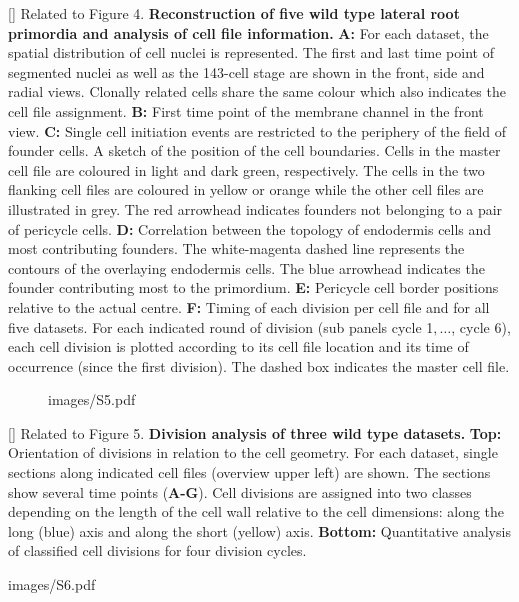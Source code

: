 []{
Related to Figure 4.
{\bf Reconstruction of five wild type lateral root primordia and analysis of cell file information.} {\bf A:} For each dataset, the spatial distribution of cell nuclei is represented. The first and last time point of segmented nuclei as well as the 143-cell stage are shown in the front, side and radial views. Clonally related cells share the same colour which also indicates the cell file assignment. {\bf B:} First time point of the membrane channel in the front view. {\bf C:} Single cell initiation events are restricted to the periphery of the field of founder cells. A sketch of the position of the cell boundaries. Cells in the master cell file are coloured in light and dark green, respectively. The cells in the two flanking cell files are coloured in yellow or orange while the other cell files are illustrated in grey. The red arrowhead indicates founders not belonging to a pair of pericycle cells. {\bf D:} Correlation between the topology of endodermis cells and most contributing founders. The white-magenta dashed line represents the contours of the overlaying endodermis cells. The blue arrowhead indicates the founder contributing most to the primordium. {\bf E:} Pericycle cell border positions relative to the actual centre. {\bf F:} Timing of each division per cell file and for all five datasets. For each indicated round of division (sub panels cycle 1$, \ldots$, cycle 6), each cell division is plotted according to its cell file location and its time of occurrence (since the first division). The dashed box indicates the master cell file.
}
\label{fig:S4}
%
\clearpage
%
\begin{figure}[htbp]
\centering
	\begin{overpic}[width=1.\linewidth]{images/S5.pdf}
	\end{overpic}
\end{figure}
\clearpage
{}[]{
Related to Figure 5.
{\bf Division analysis of three wild type datasets.} {\bf Top:} Orientation of divisions in relation to the cell geometry. For each dataset, single sections along indicated cell files (overview upper left) are shown. The sections show several time points (\textbf{A-G}). Cell divisions are assigned into two classes depending on the length of the cell wall relative to the cell dimensions: along the long (blue) axis and along the short (yellow) axis. {\bf Bottom:} Quantitative analysis of classified cell divisions for four division cycles.
}
\label{fig:S5}
%
\clearpage
%
\begin{sidewaysfigure}
\centering
	\begin{overpic}[width=1.\linewidth]{images/S6.pdf}
	\end{overpic}
\end{sidewaysfigure}
